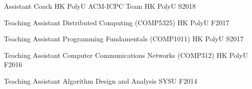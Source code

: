 \documentclass[11pt, a4paper]{awesome-cv} %
\begin{document}
\begin{cvhonors}
\cvhonor
{Assistant Coach} %
{HK PolyU ACM-ICPC Team} %
{HK PolyU} %
{S2018} %

\cvhonor
{Teaching Assistant} %
{Distributed Computing (COMP5325)} %
{HK PolyU} %
{F2017} %

\cvhonor
{Teaching Assistant} %
{Programming Fundamentals (COMP1011)} %
{HK PolyU} %
{S2017} %

\cvhonor
{Teaching Assistant} %
{Computer Communications Networks (COMP312)} %
{HK PolyU} %
{F2016} %

\cvhonor
{Teaching Assistant} %
{Algorithm Design and Analysis} %
{SYSU} %
{F2014} %
\end{cvhonors}
\end{document}
